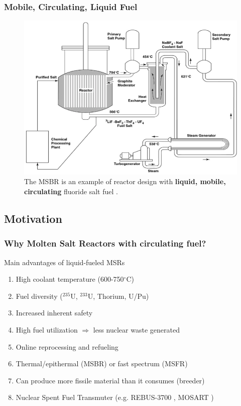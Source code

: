 \begin{frame}
  \frametitle{Mobile, Circulating, Liquid Fuel}
               \begin{figure}[t]
                \includegraphics[height=0.6\textwidth]{./images/msbr_scheme.png}
                \caption{The \gls{MSBR} is an example of reactor design with \textbf{liquid, mobile, circulating} fluoride salt fuel \cite{rosenthal_molten-salt_1970}.}
             \end{figure}   
  
\end{frame}

\subsection{Motivation}
\begin{frame}
  \frametitle{Why Molten Salt Reactors with circulating fuel?}
              \begin{block}{Main advantages of liquid-fueled \glspl{MSR} \cite{elsheikh_safety_2013}}
               \begin{enumerate}
                \item High coolant temperature (600-750$^{\circ}$C)
                \item Fuel diversity ($^{235}$U, $^{233}$U, Thorium, U/Pu)
                \item Increased inherent safety
                \item High fuel utilization $\Rightarrow$ less nuclear waste generated
                \item Online reprocessing and refueling
                \item Thermal/epithermal (\gls{MSBR}) or fast spectrum (\gls{MSFR})
                \item Can produce more fissile material than it consumes (breeder)
                \item Nuclear Spent Fuel Transmuter (e.g. REBUS-3700 \cite{mourogov_potentialities_2006-1}, MOSART \cite{ignatiev_molten_2014}) 
               \end{enumerate}
               \end{block}

\end{frame}

